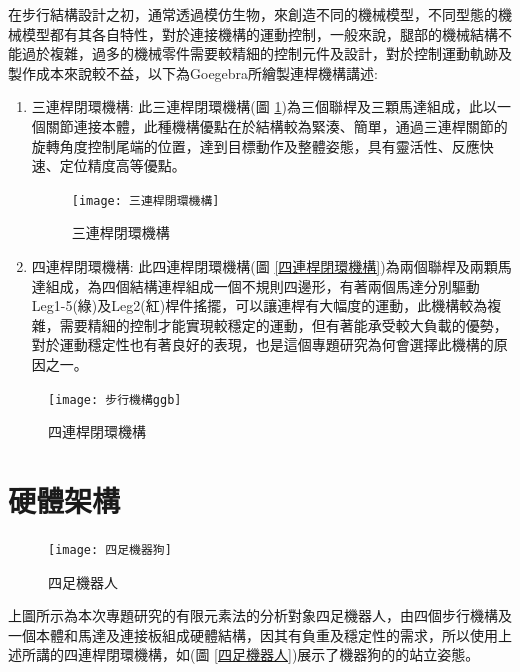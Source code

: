 在步行結構設計之初，通常透過模仿生物，來創造不同的機械模型，不同型態的機械模型都有其各自特性，對於連接機構的運動控制，一般來說，腿部的機械結構不能過於複雜，過多的機械零件需要較精細的控制元件及設計，對於控制運動軌跡及製作成本來說較不益，以下為Goegebra所繪製連桿機構講述:\
\begin{enumerate}
\item 三連桿閉環機構:
此三連桿閉環機構(圖 \ref{三連桿閉環機構})為三個聯桿及三顆馬達組成，此以一個關節連接本體，此種機構優點在於結構較為緊湊、簡單，通過三連桿關節的旋轉角度控制尾端的位置，達到目標動作及整體姿態，具有靈活性、反應快速、定位精度高等優點。\

\begin{figure}[hbt!]
\begin{center}
\texttt{[image: 三連桿閉環機構]}
\caption{\Large 三連桿閉環機構}\label{三連桿閉環機構}
\end{center}
\end{figure}
\newpage

\item 四連桿閉環機構:
此四連桿閉環機構(圖 \ref{四連桿閉環機構})為兩個聯桿及兩顆馬達組成，為四個結構連桿組成一個不規則四邊形，有著兩個馬達分別驅動Leg1-5(綠)及Leg2(紅)桿件搖擺，可以讓連桿有大幅度的運動，此機構較為複雜，需要精細的控制才能實現較穩定的運動，但有著能承受較大負載的優勢，對於運動穩定性也有著良好的表現，也是這個專題研究為何會選擇此機構的原因之一。
\end{enumerate}

\begin{figure}[hbt!]
\begin{center}
\texttt{[image: 步行機構ggb]}
\caption{\Large 四連桿閉環機構}\label{GeoGebra步行機構}
\end{center}
\end{figure}
\newpage

\section{硬體架構}

\begin{figure}[hbtp]
\begin{center}
\texttt{[image: 四足機器狗]}
\caption{\Large 四足機器人}\label{四足機器狗}
\end{center}
\end{figure}
上圖所示為本次專題研究的有限元素法的分析對象四足機器人，由四個步行機構及一個本體和馬達及連接板組成硬體結構，因其有負重及穩定性的需求，所以使用上述所講的四連桿閉環機構，如(圖 \ref{四足機器人})展示了機器狗的的站立姿態。\
\newpage

